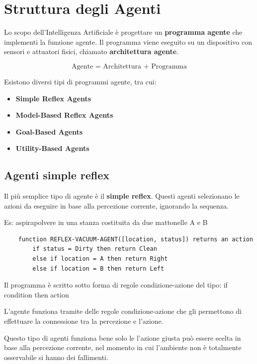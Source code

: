 \section{Struttura degli Agenti}

Lo scopo dell'Intelligenza Artificiale è progettare un
\textbf{programma agente} che implementi la funzione agente. Il programma viene eseguito su un dispositivo con sensori e attuatori fisici, chiamato \textbf{architettura agente}.

\begin{equation}
	\text{Agente = Architettura + Programma}
\end{equation}

Esistono diversi tipi di programmi agente, tra cui:

\begin{itemize}
	\item \textbf{Simple Reflex Agents}
	\item \textbf{Model-Based Reflex Agents}
	\item \textbf{Goal-Based Agents}
	\item \textbf{Utility-Based Agents}
\end{itemize}

\subsection{Agenti simple reflex}

Il più semplice tipo di agente è il \textbf{simple reflex}. Questi agenti 
selezionano le azioni da eseguire in base alla percezione corrente, ignorando
 la sequenza.

Es: aspirapolvere in una stanza costituita da due mattonelle A e B

\begin{lstlisting}
	function REFLEX-VACUUM-AGENT([location, status]) returns an action
		if status = Dirty then return Clean
		else if location = A then return Right
		else if location = B then return Left
\end{lstlisting}

Il programma è scritto sotto forma di regole condizione-azione del tipo: if condition then action

L'agente funziona tramite delle regole condizione-azione che gli permettono di effettuare la connessione tra la 
percezione e l'azione.

Questo tipo di agenti funziona bene solo le l'azione giusta può essere scelta
in base alla percezione corrente, nel momento in cui l'ambiente non è
totalmente osservabile si hanno dei fallimenti.

